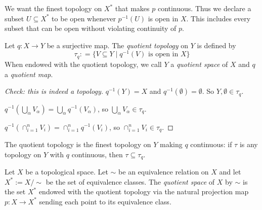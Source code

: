 We want the finest topology on $X^*$ that makes $p$ continuous. Thus we declare a subset $U\subseteq X^*$ to be open whenever $p^{-1}(U)$ is open in $X$. This includes every subset that can be open without violating continuity of $p$.






\begin{definition}
Let $q:X\to Y$ be a surjective map. The \emph{quotient topology} on $Y$ is defined by
\[\tau_q: = \{ V \subseteq Y \mid q^{-1}(V) \text{ is open in } X \}\]
When endowed with the quotient topology, we call $Y$ a \emph{quotient space} of $X$ and $q$ a \emph{quotient map}.
\end{definition}
\begin{proof}[Check: this is indeed a topology]
  $q^{-1}(Y)=X$ and $q^{-1}(\emptyset)=\emptyset$. So $Y,\emptyset\in\tau_q$.

  $q^{-1}(\bigcup_{\alpha} V_\alpha) = \bigcup_{\alpha} q^{-1}(V_\alpha)$, so $\bigcup_{\alpha} V_\alpha \in \tau_q$.

  $q^{-1}(\cap_{i=1}^nV_i) = \cap_{i=1}^n q^{-1}(V_i)$, so $\cap_{i=1}^n V_i \in \tau_q$. 
\end{proof}

\begin{remark}
  The quotient topology is the finest topology on $Y$ making $q$ continuous: if $\tau$ is any topology on $Y$ with $q$ continuous, then $\tau\subseteq \tau_q$.
\end{remark}

\begin{definition}
  Let $X$ be a topological space. Let $\sim$ be an equivalence relation on $X$ and let $X^*:=X/\sim$ be the set of equivalence classes. The \emph{quotient space} of $X$ by $\sim$ is the set $X^*$ endowed with the quotient topology via the natural projection map $p:X\to X^*$ sending each point to its equivalence class.
\end{definition}


